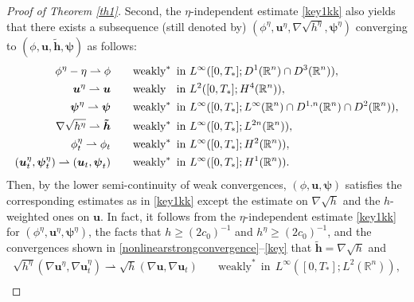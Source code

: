 \documentclass[11pt,reqno]{amsart}
\numberwithin{rk}{section}
\numberwithin{prop}{section}
\numberwithin{mydef}{section}
\numberwithin{lem}{section}
\numberwithin{equation}{section}
\numberwithin{thm}{section}
\begin{document}
\begin{proof}[Proof of {\rm Theorem \ref{th1}}]
Second, the $\eta$-independent   estimate \eqref{key1kk} also yields that 
there exists a subsequence (still denoted by) $(\phi^\eta,\boldsymbol{u}^\eta, \nabla \sqrt{h^\eta},\boldsymbol{\psi}^\eta)$ converging to $(\phi,\boldsymbol{u}, \boldsymbol{\tilde{h}},\boldsymbol{\psi})$ as follows:
\begin{equation}\label{key}
\begin{aligned}
\phi^\eta-\eta\rightharpoonup \phi \qquad &\text{weakly}^* \ \ \!\text{in } L^\infty([0,T_*];D^1(\mathbb{R}^n)\cap D^3(\mathbb{R}^n)),\\
\boldsymbol{u}^\eta\rightharpoonup \boldsymbol{u} \qquad &\text{weakly} \ \,\, \hspace{1mm} \text{in } L^2([0,T_*];H^4(\mathbb{R}^n)),\\
\boldsymbol{\psi}^\eta\rightharpoonup \boldsymbol{\psi}  \qquad &\text{weakly}^* \ \ \!\text{in } L^\infty([0,T_*];L^\infty(\mathbb{R}^n)\cap D^{1,n}(\mathbb{R}^n)\cap D^2(\mathbb{R}^n)),\\
\nabla \sqrt{h^\eta}\rightharpoonup \boldsymbol{\tilde{h}}  \qquad &\text{weakly}^* \ \ \!\text{in } L^\infty([0,T_*];L^{2n}(\mathbb{R}^n)),\\
\phi_t^\eta\rightharpoonup \phi_t \qquad &\text{weakly}^* \ \ \!\text{in } L^\infty([0,T_*];H^2(\mathbb{R}^n)),\\
(\boldsymbol{u}_t^\eta,\boldsymbol{\psi}_t^\eta)\rightharpoonup (\boldsymbol{u}_t,\boldsymbol{\psi}_t) \qquad &\text{weakly}^* \ \ \!\text{in } L^\infty([0,T_*];H^1(\mathbb{R}^n)).
\end{aligned}
\end{equation}
Then, by the lower semi-continuity of weak convergences, $(\phi,\boldsymbol{u},\boldsymbol{\psi})$ satisfies the corresponding estimates as in \eqref{key1kk} except the estimate on $\nabla \sqrt{h}$ and the  $h$-weighted ones on $\boldsymbol{u}$.
In fact, it follows from  the $\eta$-independent estimate \eqref{key1kk} for $(\phi^\eta,\boldsymbol{u}^\eta, \boldsymbol{\psi}^\eta)$,  the facts that $h\geq (2c_0)^{-1}$ and $h^\eta\geq (2c_0)^{-1}$, and  the convergences shown in \eqref{nonlinearstrongconvergence}--\eqref{key} that $\boldsymbol{\tilde{h}}=\nabla \sqrt{h}$  and
\begin{equation*} 
\begin{aligned}
\sqrt{h^
\eta}(\nabla \boldsymbol{u}^\eta,\nabla \boldsymbol{u}^\eta_t)\rightharpoonup \sqrt{h}(\nabla \boldsymbol{u},\nabla \boldsymbol{u}_t)\quad &\text{weakly}^*\ \ \!\text{in}\ \ L^\infty([0,T_*];L^2(\mathbb{R}^n)),\\

\end{aligned}
\end{equation*}
\end{proof}
\end{document}
